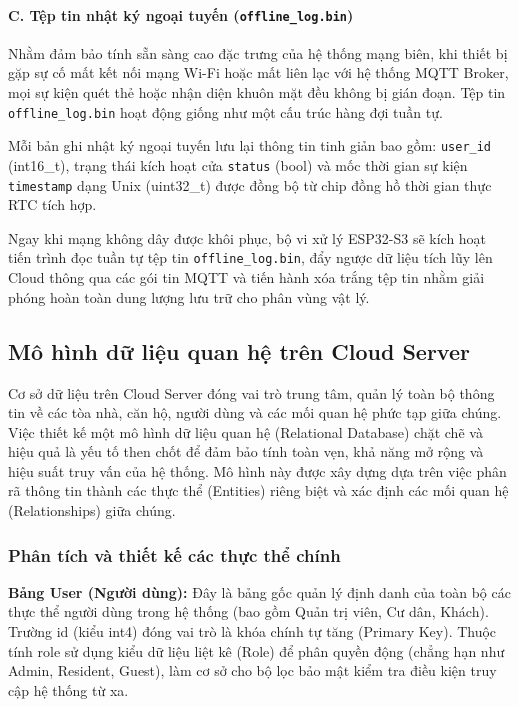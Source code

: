 \paragraph{C. Tệp tin nhật ký ngoại tuyến (\texttt{offline\_log.bin})}
Nhằm đảm bảo tính sẵn sàng cao đặc trưng của hệ thống mạng biên, khi thiết bị gặp sự cố mất kết nối mạng Wi-Fi hoặc mất liên lạc với hệ thống MQTT Broker, mọi sự kiện quét thẻ hoặc nhận diện khuôn mặt đều không bị gián đoạn. Tệp tin \texttt{offline\_log.bin} hoạt động giống như một cấu trúc hàng đợi tuần tự.

Mỗi bản ghi nhật ký ngoại tuyến lưu lại thông tin tinh giản bao gồm: \texttt{user\_id} (int16\_t), trạng thái kích hoạt cửa \texttt{status} (bool) và mốc thời gian sự kiện \texttt{timestamp} dạng Unix (uint32\_t) được đồng bộ từ chip đồng hồ thời gian thực RTC tích hợp.

Ngay khi mạng không dây được khôi phục, bộ vi xử lý ESP32-S3 sẽ kích hoạt tiến trình đọc tuần tự tệp tin \texttt{offline\_log.bin}, đẩy ngược dữ liệu tích lũy lên Cloud thông qua các gói tin MQTT và tiến hành xóa trắng tệp tin nhằm giải phóng hoàn toàn dung lượng lưu trữ cho phân vùng vật lý.

\subsection{Mô hình dữ liệu quan hệ trên Cloud Server}
Cơ sở dữ liệu trên Cloud Server đóng vai trò trung tâm, quản lý toàn bộ thông tin về các tòa nhà, căn hộ, người dùng và các mối quan hệ phức tạp giữa chúng. Việc thiết kế một mô hình dữ liệu quan hệ (Relational Database) chặt chẽ và hiệu quả là yếu tố then chốt để đảm bảo tính toàn vẹn, khả năng mở rộng và hiệu suất truy vấn của hệ thống. Mô hình này được xây dựng dựa trên việc phân rã thông tin thành các thực thể (Entities) riêng biệt và xác định các mối quan hệ (Relationships) giữa chúng.

\subsubsection{Phân tích và thiết kế các thực thể chính}
\textbf{Bảng User (Người dùng):} Đây là bảng gốc quản lý định danh của toàn bộ các thực thể người dùng trong hệ thống (bao gồm Quản trị viên, Cư dân, Khách). Trường id (kiểu int4) đóng vai trò là khóa chính tự tăng (Primary Key). Thuộc tính role sử dụng kiểu dữ liệu liệt kê (Role) để phân quyền động (chẳng hạn như Admin, Resident, Guest), làm cơ sở cho bộ lọc bảo mật kiểm tra điều kiện truy cập hệ thống từ xa.

